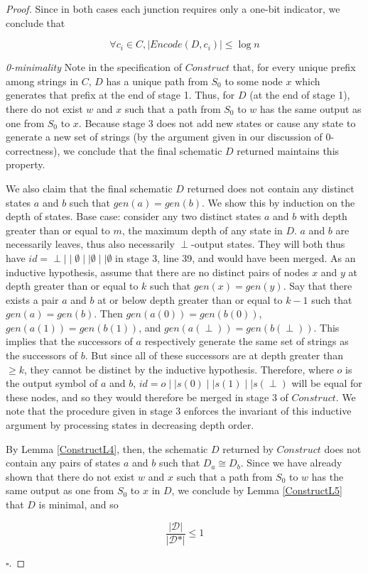 \documentclass{article}
\theoremstyle{definition}
\begin{document}
\begin{proof}
\noindent Since in both cases each junction requires only a one-bit indicator, we conclude that 

\[\forall c_i \in C, \lvert Encode(D, c_i) \rvert \leq \log{n} \]

\noindent \textit{0-minimality } Note in the specification of $Construct$ that, 
for every unique prefix among strings in $C$, $D$ has a unique path from 
$S_0$ to some node $x$ which generates that prefix at the end of stage 1.  Thus, for $D$ 
(at the end of stage 1), there do not exist $w$ and $x$ such that a path from 
$S_0$ to $w$ has the same output as one from $S_0$ to $x$.  Because stage 3 does not 
add new states or cause any state to generate a new set of strings (by the argument 
given in our discussion of 0-correctness), we conclude that the final schematic $D$ 
returned maintains this property.

We also claim that the final schematic $D$ returned does not contain any 
distinct states $a$ and $b$ such that $gen(a) = gen(b)$.  We show this by induction on 
the depth of states.  Base case: consider any two distinct states $a$ and $b$ with depth 
greater than or equal to $m$, the maximum depth of any state in $D$. $a$ and $b$ are necessarily 
leaves, thus also necessarily $\perp$-output states.  They will both thus have 
$id=\perp \mid \mid \emptyset \mid \mid \emptyset \mid \mid \emptyset$ in stage 3, line 39, and would have been merged.
As an inductive hypothesis, assume that there are no distinct pairs of nodes $x$ and 
$y$ at depth greater than or equal to $k$ such that $gen(x) = gen(y)$.  Say that there exists a 
pair $a$ and $b$ at or below depth greater than or equal to $k-1$ such that $gen(a) = gen(b)$.
Then $gen(a(0)) = gen(b(0))$, $gen(a(1)) = gen(b(1))$, and $gen(a(\perp)) = gen(b(\perp))$.
This implies that the successors of $a$ respectively generate the same set of strings as the 
successors of $b$.  But since all of these successors are at depth greater than $\geq k$, 
they cannot be distinct by the inductive hypothesis.  
Therefore, where $o$ is the output symbol of $a$ and $b$, $id= o \mid\mid s(0) \mid\mid s(1) \mid \mid s(\perp)$ will be equal 
for these nodes, and so they would therefore be merged in stage 3 of $Construct$.
We note that the procedure given in stage 3 enforces the invariant of this inductive argument 
by processing states in decreasing depth order.

By Lemma \ref{ConstructL4}, then, the schematic $D$ returned by $Construct$ 
does not contain any pairs of states $a$ and $b$ 
such that $D_a \cong D_b$.  Since we have already shown that 
there do not exist $w$ and $x$ such that a path from $S_0$ to $w$ has the 
same output as one from $S_0$ to $x$ in $D$, we conclude by Lemma \ref{ConstructL5} that 
$D$ is minimal, and so 

\[ \frac{\lvert \mathcal{D} \rvert}{\lvert \mathcal{D}* \rvert} \leq 1  \] 

$\square$.
\end{proof}
\end{document}
